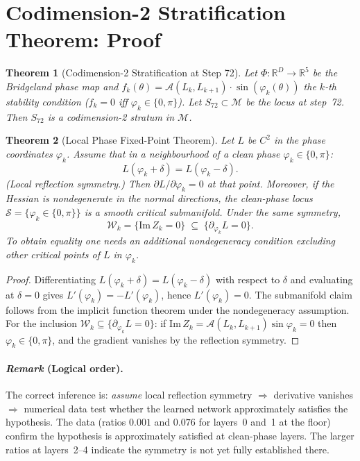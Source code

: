 \documentclass[11pt]{amsart}
\newtheorem{theorem}{Theorem}[section]
\begin{document}
\section{Codimension-2 Stratification Theorem: Proof}
\label{sec:codim2_proof}

\begin{theorem}[Codimension-2 Stratification at Step 72]
\label{thm:codim2}
Let $\Phi: \mathbb{R}^D \to \mathbb{R}^5$ be the Bridgeland phase map
and $f_k(\theta) = \mathcal{A}(L_k, L_{k+1}) \cdot \sin(\varphi_k(\theta))$
the $k$-th stability condition ($f_k = 0$ iff $\varphi_k \in \{0,\pi\}$).
Let $S_{72} \subset \mathcal{M}$ be the locus at step~72.
Then $S_{72}$ is a codimension-2 stratum in $\mathcal{M}$.
\end{theorem}

\begin{theorem}[Local Phase Fixed-Point Theorem]
\label{thm:fixed_point}
Let $L$ be $C^2$ in the phase coordinates $\varphi_k$.
Assume that in a neighbourhood of a clean phase $\varphi_k \in \{0,\pi\}$:
\[
  L(\varphi_k + \delta) = L(\varphi_k - \delta).
\]
(Local reflection symmetry.)
Then $\partial L/\partial\varphi_k = 0$ at that point.
Moreover, if the Hessian is nondegenerate in the normal directions,
the clean-phase locus $\mathcal{S} = \{\varphi_k \in \{0,\pi\}\}$
is a smooth critical submanifold.
Under the same symmetry,
\[
  \mathcal{W}_k = \{\mathrm{Im}\,Z_k = 0\}
  \;\subseteq\; \{\partial_{\varphi_k} L = 0\}.
\]
To obtain equality one needs an additional nondegeneracy condition
excluding other critical points of $L$ in $\varphi_k$.
\end{theorem}

\begin{proof}
Differentiating $L(\varphi_k + \delta) = L(\varphi_k - \delta)$
with respect to $\delta$ and evaluating at $\delta = 0$ gives
$L'(\varphi_k) = -L'(\varphi_k)$, hence $L'(\varphi_k) = 0$.
The submanifold claim follows from the implicit function theorem
under the nondegeneracy assumption.
For the inclusion $\mathcal{W}_k \subseteq \{\partial_{\varphi_k}L=0\}$:
if $\mathrm{Im}\,Z_k = \mathcal{A}(L_k,L_{k+1})\sin\varphi_k = 0$
then $\varphi_k \in \{0,\pi\}$, and the gradient vanishes by the
reflection symmetry.
\end{proof}

\paragraph{\textit{Remark} (Logical order).}
The correct inference is:
\emph{assume} local reflection symmetry $\Rightarrow$
derivative vanishes $\Rightarrow$
numerical data test whether the learned network approximately
satisfies the hypothesis.
The data (ratios $0.001$ and $0.076$ for layers~0 and~1 at the floor)
confirm the hypothesis is approximately satisfied at clean-phase layers.
The larger ratios at layers~2--4 indicate the symmetry is not yet
fully established there.
\end{document}
